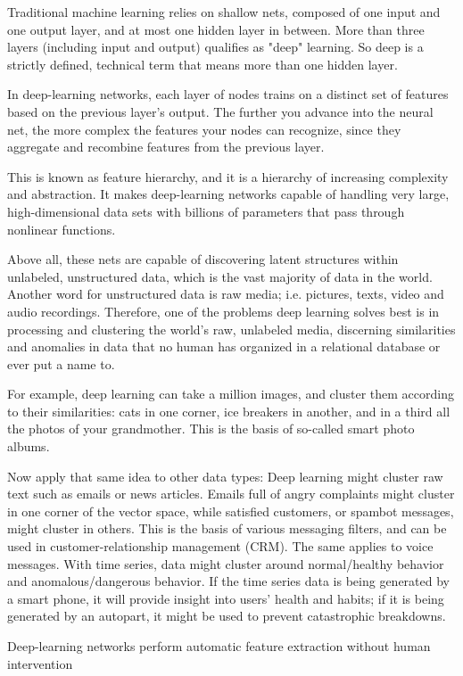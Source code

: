 {Traditional machine learning relies on shallow nets, composed of one input and one output layer, and at most one hidden layer in between. More than three layers (including input and output) qualifies as "deep" learning. So deep is a strictly defined, technical term that means more than one hidden layer.

In deep-learning networks, each layer of nodes trains on a distinct set of features based on the previous layer’s output. The further you advance into the neural net, the more complex the features your nodes can recognize, since they aggregate and recombine features from the previous layer.

This is known as feature hierarchy, and it is a hierarchy of increasing complexity and abstraction. It makes deep-learning networks capable of handling very large, high-dimensional data sets with billions of parameters that pass through nonlinear functions.

Above all, these nets are capable of discovering latent structures within unlabeled, unstructured data, which is the vast majority of data in the world. Another word for unstructured data is raw media; i.e. pictures, texts, video and audio recordings. Therefore, one of the problems deep learning solves best is in processing and clustering the world’s raw, unlabeled media, discerning similarities and anomalies in data that no human has organized in a relational database or ever put a name to.

For example, deep learning can take a million images, and cluster them according to their similarities: cats in one corner, ice breakers in another, and in a third all the photos of your grandmother. This is the basis of so-called smart photo albums.

Now apply that same idea to other data types: Deep learning might cluster raw text such as emails or news articles. Emails full of angry complaints might cluster in one corner of the vector space, while satisfied customers, or spambot messages, might cluster in others. This is the basis of various messaging filters, and can be used in customer-relationship management (CRM). The same applies to voice messages. With time series, data might cluster around normal/healthy behavior and anomalous/dangerous behavior. If the time series data is being generated by a smart phone, it will provide insight into users’ health and habits; if it is being generated by an autopart, it might be used to prevent catastrophic breakdowns.

Deep-learning networks perform automatic feature extraction without human intervention

}
